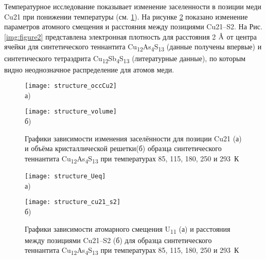 Температурное исследование показывает изменение  заселенности в позиции меди Cu21 при понижении температуры (см. \ref{img:structure1}). На рисунке \ref{img:structure2} показано изменение  параметров атомного смещения и расстояния между позициями Cu21--S2.
На Рис. \ref{img:figure2} представлена электронная плотность для расстояния 2 $\mbox{\normalfont\AA}$ от центра ячейки для синтетического теннантита Cu\textsubscript{12}As\textsubscript{4}S\textsubscript{13} (данные получены впервые) и синтетического тетраэдрита Cu\textsubscript{12}Sb\textsubscript{4}S\textsubscript{13} (литературные данные), по которым видно неоднозначное распределение для атомов меди.

\begin{figure}[p!]
  \begin{minipage}[ht]{0.9\linewidth}\centering
    \texttt{[image: structure\_occCu2]} \\ а)
  \end{minipage}
  \vfill
  \begin{minipage}[ht]{0.9\linewidth}\centering
    \texttt{[image: structure\_volume]} \\ б)
  \end{minipage}

      \caption[Графики зависимости изменения заселённости для позиции Cu21(а) и объёма кристаллической решетки (б) образца синтетического теннантита Cu\textsubscript{12}As\textsubscript{4}S\textsubscript{13} при температурах 85, 115, 180, 250 и 293~К]{Графики зависимости изменения заселённости для позиции Cu21 (а) и объёма кристаллической решетки(б) образца синтетического теннантита Cu\textsubscript{12}As\textsubscript{4}S\textsubscript{13} при температурах 85, 115, 180, 250 и 293~К}
    \label{img:structure1}
\end{figure}

\begin{figure}[p!]
  \begin{minipage}[ht]{0.9\linewidth}\centering
    \texttt{[image: structure\_Ueq]} \\ а)
  \end{minipage}
  \vfill
  \begin{minipage}[ht]{0.9\linewidth}\centering
    \texttt{[image: structure\_cu21\_s2]} \\ б)
  \end{minipage}

      \caption[Графики зависимости атомарного смещения U\textsubscript{11} (а) и расстояния между позициями Cu21--S2 (б) для образца синтетического теннантита Cu\textsubscript{12}As\textsubscript{4}S\textsubscript{13} при температурах 85, 115, 180, 250 и 293~К]{Графики зависимости атомарного смещения U\textsubscript{11} (а) и расстояния между позициями Cu21--S2 (б) для образца синтетического теннантита Cu\textsubscript{12}As\textsubscript{4}S\textsubscript{13} при температурах 85, 115, 180, 250 и 293~К}
    \label{img:structure2}
\end{figure}
\newpage

